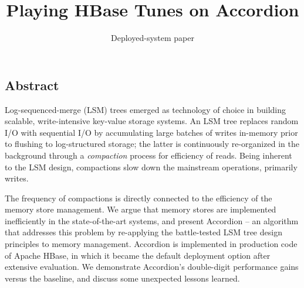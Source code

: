 \documentclass[letterpaper,twocolumn,10pt]{article}
\newcommand{\remove}[1]{}
\newcommand{\tb}{\hspace{5mm}}
\newcommand{\sys}{Accordion}
\begin{document}
\date{}

\title{\Large \bf  Playing HBase Tunes on \sys}


\author{
\remove{
Edward Bortnikov\footnotemark[1]  \tb
Anastasia Braginsky\footnotemark[1]  \tb
Eshcar Hillel\footnotemark[1] \tb 
Idit Keidar\footnotemark[1] \footnotemark[2] \\
	\footnotemark[1] Yahoo Research\ \ \footnotemark[2] Technion  \\ [2mm]
}
Deployed-system paper
} %

\maketitle




\subsection*{Abstract}

Log-sequenced-merge (LSM) trees emerged as technology of choice in building scalable, 
write-intensive key-value storage systems. An LSM tree replaces random I/O with sequential 
I/O by accumulating large batches of writes in-memory  prior to flushing to log-structured 
storage; the latter is continuously re-organized in the background through a {\em compaction}
process for efficiency of reads. Being inherent to the LSM design, compactions slow down
the mainstream operations, primarily writes. 

The frequency of compactions is directly connected to the efficiency of the memory store 
management. We argue that memory stores are implemented  inefficiently in the state-of-the-art 
systems, and present \sys\/ -- an algorithm that addresses this problem by re-applying
the battle-tested LSM tree design principles to memory management. \sys\/ is implemented
in production code of Apache HBase, in which it became the default deployment option 
after extensive evaluation. We demonstrate \sys's double-digit performance gains versus 
the baseline, and discuss some unexpected lessons learned. 
\end{document}
